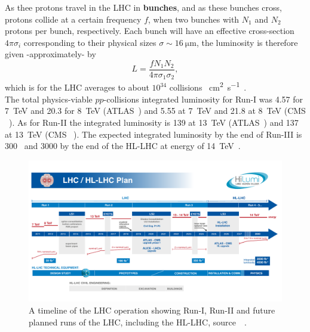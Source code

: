 As thee protons travel in the LHC in \textbf{bunches}, and as these bunches cross, protons collide at a certain frequency $f$,  when two bunches with $N_1$ and $N_2$ protons per bunch, respectively. Each bunch will have an effective cross-section~$4 \pi \sigma_i$ corresponding to their physical sizes $\sigma \sim \SI{16}{\micro \meter}$, the luminosity is therefore given -approximately- by 
\begin{equation}
	L = \frac{f N_1 N_2}{4 \pi  \sigma_1 \sigma_2},
\end{equation}
which is for the LHC averages to about $ 10^{34}$ collisions \si{\per \centi\metre\squared \per \second}~\cite{closer,lhcpreformance}.  \\ The total physics-viable $pp$-collisions  integrated luminosity for Run-I was \SI{4.57}{\infb} for \SI{7}{\tera\electronvolt} and \SI{20.3}{\infb} for \SI{8}{\tera\electronvolt} (ATLAS~\cite{atlaslumi1}) and  \SI{5.55}{\infb} at \SI{7}{\tera\electronvolt} and \SI{21.8}{\infb} at \SI{8}{\tera\electronvolt} (CMS ~\cite{cmslumi}). As for Run-II the integrated luminosity is \SI{139}{\infb} at \SI{13}{\tera\electronvolt } (ATLAS~\cite{atlaslumi2})  and \SI{137}{\infb} at \SI{13}{\tera\electronvolt } (CMS ~\cite{cmslumi}). The expected integrated luminosity by the end of Run-III is  \SI{300}{\infb}~\cite{Fartoukh:2790409} and \SI{3000}{\infb} by the end of the HL-LHC at energy of \SI{14}{\tera\electronvolt }~\cite{Apollinari:2015bam}. 
\begin{figure}[htbp!]
	\centering
		\includegraphics[width=\textwidth]{figures/HL-LHC-plan-2021-1}
	\caption{ A timeline of the LHC operation showing Run-I, Run-II and future planned runs of the LHC, including the HL-LHC, source~~\cite{lhckomission}. 
	}
\label{fig:lhcplan}
\end{figure}
